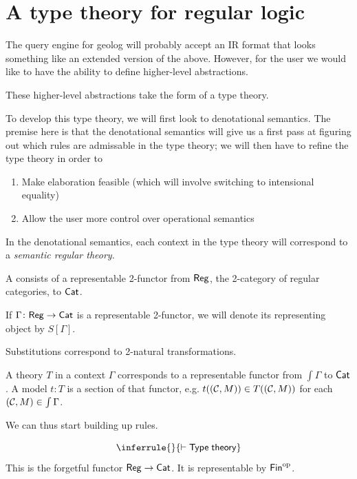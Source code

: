 \documentclass{article}
\begin{document}
\section{A type theory for regular logic}

The query engine for geolog will probably accept an IR format that looks something like an extended version of the above. However, for the user we would like to have the ability to define higher-level abstractions.

These higher-level abstractions take the form of a type theory.

To develop this type theory, we will first look to denotational semantics. The premise here is that the denotational semantics will give us a first pass at figuring out which rules are admissable in the type theory; we will then have to refine the type theory in order to

\begin{enumerate}
  \item Make elaboration feasible (which will involve switching to intensional equality)
  \item Allow the user more control over operational semantics
\end{enumerate}

In the denotational semantics, each context in the type theory will correspond to a \emph{semantic regular theory}.

\begin{definition}
  A  consists of a representable 2-functor from $\mathsf{Reg}$, the 2-category of regular categories, to $\mathsf{Cat}$.
\end{definition}

If $\Gamma \colon \mathsf{Reg} \to \mathsf{Cat}$ is a representable 2-functor, we will denote its representing object by $S[\Gamma]$.

Substitutions correspond to 2-natural transformations.

A theory $T$ in a context $\Gamma$ corresponds to a representable functor from $\int \Gamma$ to $\mathsf{Cat}$. A model $t \colon T$ is a section of that functor, e.g. $t((\mathcal{C},M)) \in T((\mathcal{C},M))$ for each $(\mathcal{C},M) \in \int \Gamma$.

We can thus start building up rules.

\begin{ttrule}
\[\inferrule{}{\yields \ms{Type} \jdg{theory}}\]
This is the forgetful functor $\mathsf{Reg} \to \mathsf{Cat}$. It is representable by $\mathsf{Fin}^\mathrm{op}$.
\end{ttrule}
\end{document}
